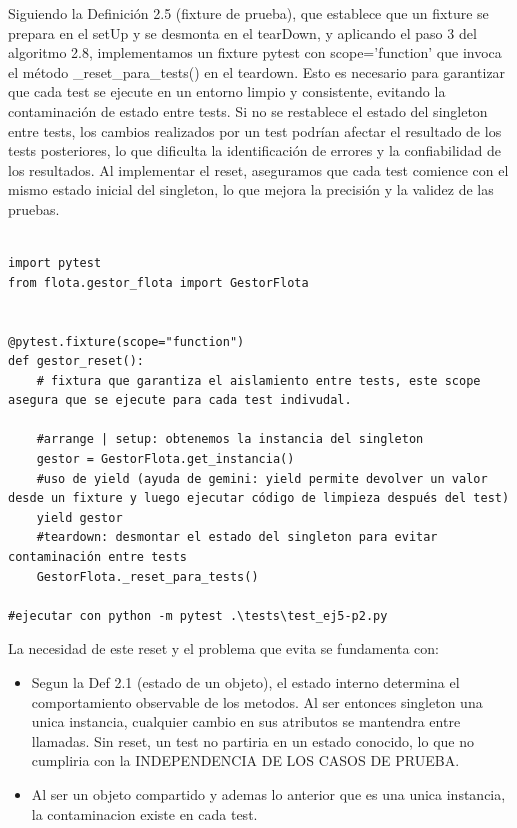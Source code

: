 {Siguiendo la Definición 2.5 (fixture de prueba), que establece que un fixture se prepara en el setUp y se desmonta en el tearDown,
y aplicando el paso 3 del algoritmo 2.8, implementamos un fixture pytest con scope='function' que invoca el 
método \_reset\_para\_tests() en el teardown. Esto es necesario para garantizar que cada test se ejecute en 
un entorno limpio y consistente, evitando la contaminación de estado entre tests. Si no se restablece el 
estado del singleton entre tests, los cambios realizados por un test podrían afectar el resultado de los 
tests posteriores, lo que dificulta la identificación de errores y la confiabilidad de los resultados. Al
 implementar el reset, aseguramos que cada test comience con el mismo estado inicial del singleton, lo 
 que mejora la precisión y la validez de las pruebas.

\begin{verbatim}
    
import pytest
from flota.gestor_flota import GestorFlota


@pytest.fixture(scope="function")
def gestor_reset():
    # fixtura que garantiza el aislamiento entre tests, este scope asegura que se ejecute para cada test indivudal.

    #arrange | setup: obtenemos la instancia del singleton
    gestor = GestorFlota.get_instancia()
    #uso de yield (ayuda de gemini: yield permite devolver un valor desde un fixture y luego ejecutar código de limpieza después del test)
    yield gestor 
    #teardown: desmontar el estado del singleton para evitar contaminación entre tests
    GestorFlota._reset_para_tests()

#ejecutar con python -m pytest .\tests\test_ej5-p2.py 
\end{verbatim}

 La necesidad de este reset y el problema que evita se fundamenta con:
\begin{itemize}
    \item Segun la Def 2.1 (estado de un objeto), el estado interno determina el comportamiento observable de los metodos. Al ser entonces singleton una unica instancia, cualquier cambio en sus atributos se mantendra entre llamadas. Sin reset, un test no partiria en un estado conocido, lo que no cumpliria con la INDEPENDENCIA DE LOS CASOS DE PRUEBA.
    \item Al ser un objeto compartido y ademas lo anterior que es una unica instancia, la contaminacion existe en cada test.
\end{itemize}

}

